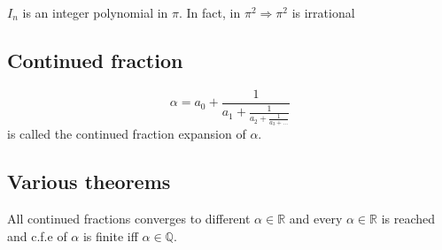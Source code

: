   \begin{lemma}
    $I_n$ is an integer polynomial in $\pi$. In fact, in $\pi^2 \Rightarrow
    \pi^2$ is irrational
  \end{lemma}

  \subsection*{Continued fraction}
    $$
      \alpha = a_0 + \frac{1}{a_1 + \frac{1}{a_2 + \frac{1}{a_3 + \ldots }}}
    $$
    is called the continued fraction expansion of $\alpha$.\\

  \subsection*{Various theorems}
    All continued fractions converges to different $\alpha \in \mathbb{R}$
    and every $\alpha \in \mathbb{R}$ is reached and c.f.e of $\alpha$ is finite
    iff $\alpha \in \mathbb{Q}$.
